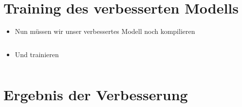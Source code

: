 \documentclass[t]{beamer}
\newcommand\pycode[1]{\inputminted[frame=lines, framesep=2mm, fontsize=\normalsize]{python}{#1}}
\begin{document}
\section{Training des verbesserten Modells}
\begin{frame}
    \begin{itemize}
        \item Nun müssen wir unser verbessertes Modell noch kompilieren
        \pycode{./code-snippets/model-compile.py}
        \item Und trainieren
        \pycode{./code-snippets/improved-model-fit.py}
    \end{itemize}
\end{frame}

\section{Ergebnis der Verbesserung}
\end{document}

